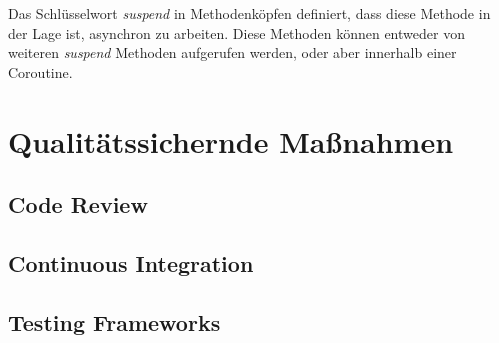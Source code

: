 				Das Schlüsselwort \textit{suspend} in Methodenköpfen definiert, dass diese Methode in der Lage ist, asynchron zu arbeiten. Diese Methoden können entweder von weiteren \textit{suspend} Methoden aufgerufen werden, oder aber innerhalb einer Coroutine. 
		
	\section{Qualitätssichernde Maßnahmen}
	
		\subsection{Code Review}
		
	
		\subsection{Continuous Integration}
		
		\subsection{Testing Frameworks}
		                                                                                                                                                                                                                                                                                                                                         
	